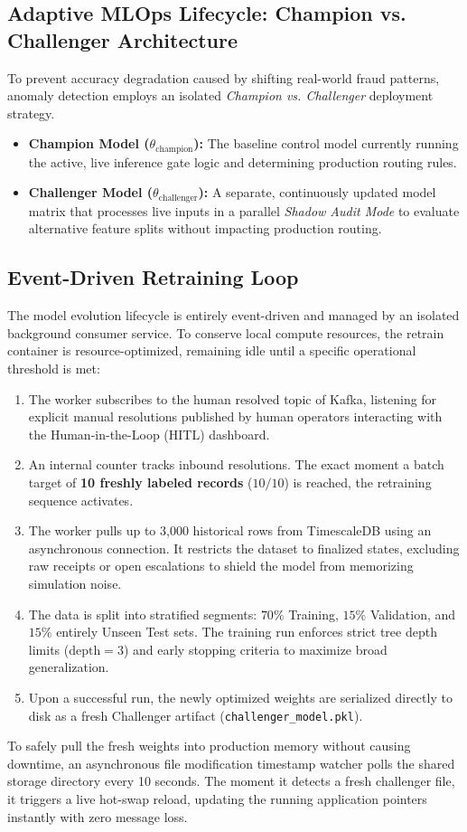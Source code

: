 \documentclass[12pt]{report}
\begin{document}
\subsection{Adaptive MLOps Lifecycle: Champion vs. Challenger Architecture}
To prevent accuracy degradation caused by shifting real-world fraud patterns, anomaly detection employs an isolated \textit{Champion vs. Challenger} deployment strategy. 
\begin{itemize}
    \item \textbf{Champion Model ($\theta_{\text{champion}}$):} The baseline control model currently running the active, live inference gate logic and determining production routing rules.
    \item \textbf{Challenger Model ($\theta_{\text{challenger}}$):} A separate, continuously updated model matrix that processes live inputs in a parallel \textit{Shadow Audit Mode} to evaluate alternative feature splits without impacting production routing.
\end{itemize}

\subsection{Event-Driven Retraining Loop}
The model evolution lifecycle is entirely event-driven and managed by an isolated background consumer service. To conserve local compute resources, the retrain container is resource-optimized, remaining idle until a specific operational threshold is met:

\begin{enumerate}
    \item The worker subscribes to the human resolved topic of Kafka, listening for explicit manual resolutions published by human operators interacting with the Human-in-the-Loop (HITL) dashboard.
    \item An internal counter tracks inbound resolutions. The exact moment a batch target of \textbf{10 freshly labeled records} ($10/10$) is reached, the retraining sequence activates.
    \item The worker pulls up to 3,000 historical rows from TimescaleDB using an asynchronous connection. It restricts the dataset to finalized states, excluding raw receipts or open escalations to shield the model from memorizing simulation noise.
    \item The data is split into stratified segments: $70\%$ Training, $15\%$ Validation, and $15\%$ entirely Unseen Test sets. The training run enforces strict tree depth limits ($\text{depth}=3$) and early stopping criteria to maximize broad generalization.
    \item Upon a successful run, the newly optimized weights are serialized directly to disk as a fresh Challenger artifact (\texttt{challenger\_model.pkl}).
\end{enumerate}
To safely pull the fresh weights into production memory without causing downtime, an asynchronous file modification timestamp watcher polls the shared storage directory every 10 seconds. The moment it detects a fresh challenger file, it triggers a live hot-swap reload, updating the running application pointers instantly with zero message loss.
\end{document}

